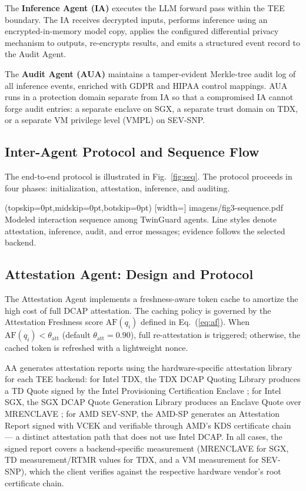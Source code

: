 \documentclass{ieeeaccess}
\begin{document}
The \textbf{Inference Agent (IA)} executes the LLM forward pass within the
TEE boundary. The IA receives decrypted inputs, performs inference using an
encrypted-in-memory model copy, applies the configured differential privacy
mechanism to outputs, re-encrypts results, and emits a structured event record
to the Audit Agent.

The \textbf{Audit Agent (AUA)} maintains a tamper-evident Merkle-tree audit
log of all inference events, enriched with GDPR and HIPAA control mappings.
AUA runs in a protection domain separate from IA so that a compromised IA
cannot forge audit entries: a separate enclave on SGX, a separate trust domain
on TDX, or a separate VM privilege level (VMPL) on SEV-SNP.

\subsection{Inter-Agent Protocol and Sequence Flow}

The end-to-end protocol is illustrated in Fig.~\ref{fig:seq}. The protocol proceeds in four phases: initialization, attestation, inference, and auditing.

\Figure[t!](topskip=0pt,midskip=0pt,botskip=0pt)
[width=\textwidth]
{imagens/fig3-sequence.pdf}
{Modeled interaction sequence among TwinGuard agents. Line styles denote
attestation, inference, audit, and error messages; evidence follows the selected
backend.\label{fig:seq}}


\subsection{Attestation Agent: Design and Protocol}

The Attestation Agent implements a freshness-aware token cache to amortize
the high cost of full DCAP attestation. The caching policy is governed by
the Attestation Freshness score $\mathrm{AF}(q_i)$ defined in
Eq.~(\ref{eq:af}). When $\mathrm{AF}(q_i) < \theta_{\text{att}}$ (default $\theta_{\text{att}} = 0.90$), full re-attestation is triggered; otherwise,
the cached token is refreshed with a lightweight nonce.

AA generates attestation reports using the hardware-specific attestation
library for each TEE backend: for Intel TDX, the TDX DCAP Quoting Library
produces a TD Quote signed by the Intel Provisioning Certification Enclave
\cite{inteltdx2023}; for Intel SGX, the SGX DCAP Quote Generation Library
produces an Enclave Quote over MRENCLAVE \cite{johnson2016intel}; for
AMD SEV-SNP, the AMD-SP generates an Attestation Report signed with VCEK
and verifiable through AMD's KDS certificate chain \cite{amdsev2020} ---
a distinct attestation path that does not use Intel DCAP. In all cases,
the signed report covers a backend-specific measurement (MRENCLAVE for SGX,
TD measurement/RTMR values for TDX, and a VM measurement for SEV-SNP), which
the client verifies against the respective
hardware vendor's root certificate chain.
\end{document}
